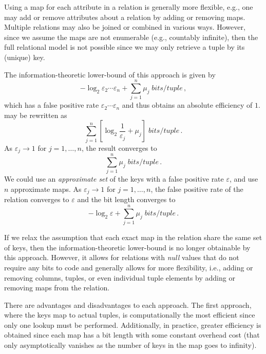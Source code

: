 \documentclass[ ../main.tex]{subfiles}
\begin{document}
Using a map for each attribute in a relation is generally more flexible, e.g., one may add or remove attributes about a relation by adding or removing maps. Multiple relations may also be joined or combined in various ways. However, since we assume the maps are not enumerable (e.g., countably infinite), then the full relational model is not possible since we may only retrieve a tuple by its (unique) key.

The information-theoretic lower-bound of this approach is given by
\begin{equation}
\label{eq:lb_join}
    -\log_2 \varepsilon_2 \cdots \varepsilon_n + \sum_{j=1}^{n} \mu_j \; \si{bits \per tuple}\,,
\end{equation}
which has a false positive rate $\varepsilon_2 \cdots \varepsilon_n$ and thus obtains an absolute efficiency of $1$.  may be rewritten as
\begin{equation}
    \sum_{j=1}^{n} \left[\log_2 \frac{1}{\varepsilon_j} + \mu_j\right] \; \si{bits \per tuple}\,.
\end{equation}
As $\varepsilon_j \to 1$ for $j=1,\ldots,n$, the result converges to
\begin{equation}
    \sum_{j=1}^{n} \mu_j \; \si{bits \per tuple}\,.
\end{equation}
We could use an \emph{approximate set}\cite{aset} of the keys with a false positive rate $\varepsilon$, and use $n$ approximate maps. As $\varepsilon_j \to 1$ for $j=1,\ldots,n$, the false positive rate of the relation converges to $\varepsilon$ and the bit length converges to
\begin{equation}
    -\log_2 \varepsilon + \sum_{j=1}^{n} \mu_j \; \si{bits \per tuple}\,.
\end{equation}

If we relax the assumption that each exact map in the relation share the same set of keys, then the information-theoretic lower-bound is no longer obtainable by this approach. However, it allows for relations with \emph{null} values that do not require any bits to code and generally allows for more flexibility, i.e., adding or removing columns, tuples, or even individual tuple elements by adding or removing maps from the relation.

There are advantages and disadvantages to each approach. The first approach, where the keys map to actual tuples, is computationally the most efficient since only one lookup must be performed. Additionally, in practice, greater efficiency is obtained since each map has a bit length with some constant overhead cost (that only asymptotically vanishes as the number of keys in the map goes to infinity).
\end{document}
